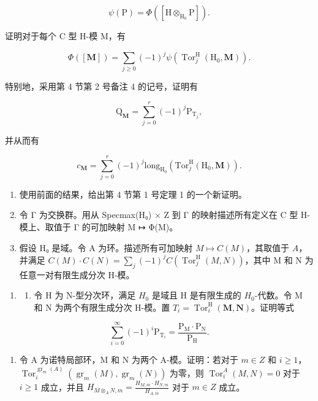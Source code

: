 \[
\psi (\mathrm{P}) = \Phi ([ \mathrm{H} \otimes_ {\mathrm{H} _ {0}} \mathrm{P} ]).
\]

证明对于每个 C 型 H-模 M，有

\[
\Phi ([ \mathbf {M} ]) = \sum_ {j \geqslant 0} (- 1) ^ {j} \psi (\operatorname{Tor} _ {j} ^ {\mathrm{H}} (\mathrm{H} _ {0}, \mathbf {M})).
\]

特别地，采用第 4 节第 2 号备注 4 的记号，证明有

\[
\mathrm{Q} _ {\mathbf {M}} = \sum_ {j = 0} ^ {r} (- 1) ^ {j} \mathrm{P} _ {\mathrm{T} _ {j}},
\]

并从而有

\[
c _ {\mathbf {M}} = \sum_ {j = 0} ^ {r} (- 1) ^ {j} \mathrm{long} _ {\mathrm{H} _ {0}} (\mathrm{Tor} _ {j} ^ {\mathrm{H}} (\mathrm{H} _ {0}, \mathbf {M})).
\]

\begin{enumerate}
\def\labelenumi{\alph{enumi})}
\setcounter{enumi}{6}
\tightlist
\item
  使用前面的结果，给出第 4 节第 1 号定理 1 的一个新证明。
\item
  令 Γ 为交换群。用从 Specmax(H₀) × Z 到 Γ 的映射描述所有定义在 C 型 H-模上、取值于 Γ 的可加映射 M ↦ Φ(M)。
\item
  假设 H₀ 是域。令 A 为环。描述所有可加映射 \(M\mapsto C(M)\)，其取值于 \(A\)，并满足 \(C(M)\cdot C(N) = \sum_j(-1)^j C(\operatorname{Tor}_{j}^{\mathrm{H}}(M,N))\)，其中 M 和 N 为任意一对有限生成分次 H-模。
\end{enumerate}

\begin{enumerate}
\def\labelenumi{\arabic{enumi})}
\setcounter{enumi}{4}
\tightlist
\item
  \begin{enumerate}
  \def\labelenumii{\alph{enumii})}
  \tightlist
  \item
    令 H 为 N-型分次环，满足 \(H_{0}\) 是域且 H 是有限生成的 \(H_{0}\)-代数。令 M 和 N 为两个有限生成分次 H-模。置 \(T_{i} = \operatorname{Tor}_{i}^{\mathrm{H}}(\mathbf{M}, \mathbf{N})\)。证明等式
  \end{enumerate}
\end{enumerate}

\[
\sum_ {i = 0} ^ {\infty} (- 1) ^ {i} \mathrm{P} _ {\mathrm{T} _ {i}} = \frac {\mathrm{P} _ {\mathrm{M}} \cdot \mathrm{P} _ {\mathrm{N}}}{\mathrm{P} _ {\mathrm{H}}}.
\]

\begin{enumerate}
\def\labelenumi{\alph{enumi})}
\setcounter{enumi}{1}
\tightlist
\item
  令 A 为诺特局部环，M 和 N 为两个 A-模。证明：若对于 \(m \in Z\) 和 \(i \geqslant 1\)，\(\operatorname{Tor}_{i}^{\operatorname{gr}_{m}(A)}(\operatorname{gr}_{m}(M), \operatorname{gr}_{m}(N))\) 为零，则 \(\operatorname{Tor}_{i}^{A}(M, N) = 0\) 对于 \(i \geqslant 1\) 成立，并且 \(H_{M \otimes_{A} N, m} = \frac{H_{M, m} \cdot H_{N, m}}{H_{A, m}}\) 对于 \(m \in Z\) 成立。
\end{enumerate}

